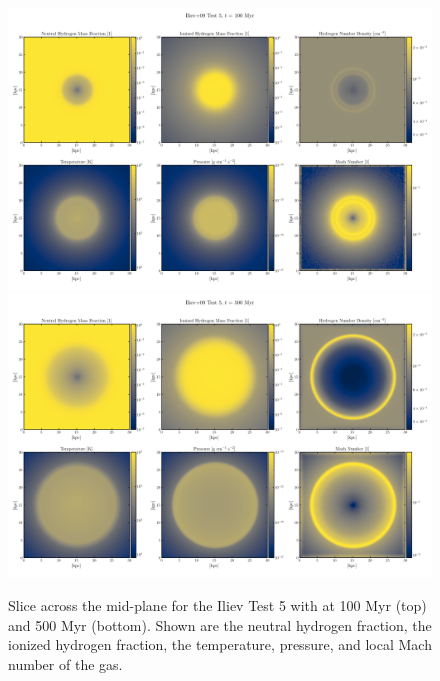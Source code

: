 \begin{figure}
\centering
\includegraphics[width=\textwidth]{figures/RHD/Iliev5/output_0010-NoRef.png}\\
\includegraphics[width=\textwidth]{figures/RHD/Iliev5/output_0051-NoRef.png}
\caption{
Slice across the mid-plane for the Iliev Test 5 with \GEARRT at 100 Myr (top) and 500 Myr (bottom).
Shown are the neutral hydrogen fraction, the ionized hydrogen fraction, the temperature, pressure,
and local Mach number of the gas.
}
\label{fig:iliev5-slice}
\end{figure}


